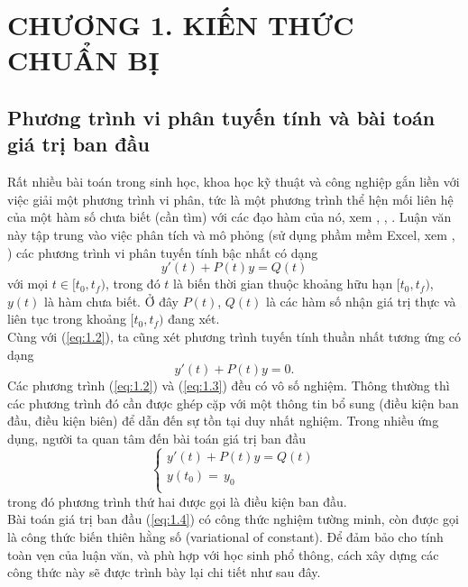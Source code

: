 \section*{CHƯƠNG 1.  KIẾN THỨC CHUẨN BỊ}
\setcounter{section}{1}
\setcounter{figure}{0}
\setcounter{table}{0}
\subsection{Phương trình vi phân tuyến tính và bài toán giá trị ban đầu}
Rất nhiều bài toán trong sinh học, khoa học kỹ thuật và công nghiệp gắn liền với việc giải một phương trình vi phân, tức là một phương trình thể hện mối liên hệ của một hàm số chưa biết (cần tìm) với các đạo hàm của nó, xem \cite{ref1}, \cite{ref6}, \cite{ref4}. Luận văn này tập trung vào việc phân tích và mô phỏng (sử dụng phầm mềm Excel, xem \cite{ref2}, \cite{ref5}) các phương trình vi phân tuyến tính bậc nhất có dạng                                
\begin{equation}
	y'(t)+P(t)y=Q(t)
	\label{eq:1.2}
\end{equation}
với mọi $t \in [{t}_{0},{{t}_{f}})$, trong đó $t$ là biến thời gian thuộc khoảng hữu hạn $[{t}_{0},{{t}_{f}})$, $y(t)$ là hàm chưa biết. Ở đây $P(t)$, $Q(t)$ là các hàm số nhận giá trị thực và liên tục trong khoảng $[t_0, t_f)$ đang xét. \\
Cùng với (\ref{eq:1.2}), ta cũng xét phương trình tuyến tính thuần nhất tương ứng có dạng 
\begin{equation}
	y'(t)+P(t)y=0.
	\label{eq:1.3}
\end{equation}
Các phương trình (\ref{eq:1.2}) và (\ref{eq:1.3}) đều có vô số nghiệm. Thông thường thì các phương trình đó cần được ghép cặp với một thông tin bổ sung (điều kiện ban đầu, điều kiện biên) để dẫn đến sự tồn tại duy nhất nghiệm.  Trong nhiều ứng dụng, người ta quan tâm đến bài toán giá trị ban đầu  
\begin{equation}
	\left\{ \begin{array}{l}
	y'(t)+P(t)y=Q(t) \\ 
	y({{t}_{0}})=\,{{y}_{0}} \\ 
\end{array} \right.
\label{eq:1.4}
\end{equation}
trong đó phương trình thứ hai được gọi là điều kiện ban đầu. \\
Bài toán giá trị ban đầu (\ref{eq:1.4}) có công thức nghiệm tường minh, còn được gọi là công thức biến thiên hằng số (variational of constant). Để đảm bảo cho tính toàn vẹn của luận văn, và phù hợp với học sinh phổ thông, cách xây dựng các công thức này sẽ được trình bày lại chi tiết như sau đây. \\
